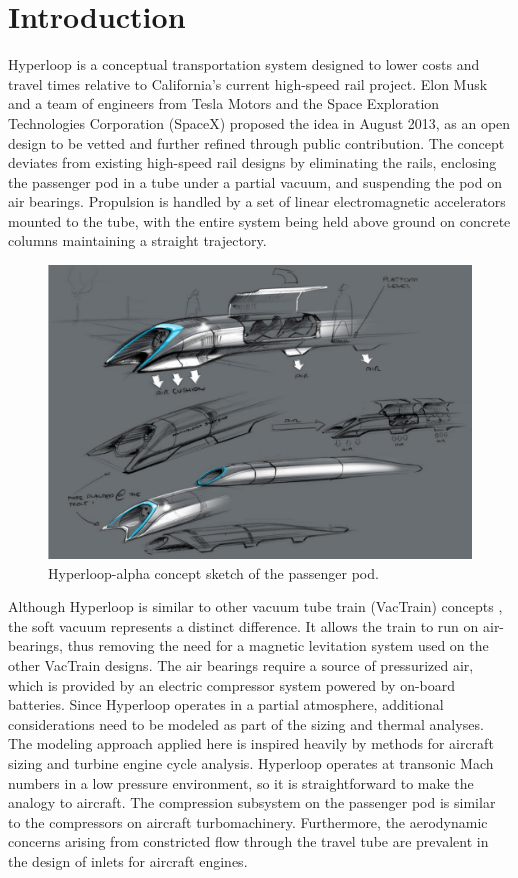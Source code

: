 \documentclass[heading.tex]{subfiles}
\begin{document}
\section{Introduction}

Hyperloop is a conceptual transportation system designed to lower costs and travel times relative to California's current high-speed rail project.
\cite{Musk} Elon Musk and a team of engineers from Tesla Motors and the Space Exploration Technologies Corporation (SpaceX)
proposed the idea in August 2013, as an open design to be vetted and further refined through public contribution.
The concept deviates from existing high-speed rail designs by eliminating the rails, enclosing the passenger pod in a 
tube under a partial vacuum, and suspending the pod on air bearings. Propulsion is handled by a set of linear 
electromagnetic accelerators mounted to the tube, with the entire system being held above ground on concrete 
columns maintaining a straight trajectory.

\begin{figure}[hbtp]
\centering
\includegraphics[width=.75\textwidth]{images/hyperloopAlphaSketch.png}
 \caption[Hyperloop Concept Sketch]{Hyperloop-alpha concept sketch of the passenger pod. \cite{Musk}}
\label{f:hyperloopSketch}
\end{figure}

Although Hyperloop is similar to other vacuum tube train (VacTrain) concepts \cite{ET3}, the soft vacuum represents a distinct difference.
It allows the train to run on air-bearings, thus removing the need for a magnetic levitation system used on the other VacTrain designs.
The air bearings require a source of pressurized air, which is provided by an electric compressor system powered by on-board batteries.
Since Hyperloop operates in a partial atmosphere, additional considerations need to be modeled as part of the sizing and thermal analyses. 
The modeling approach applied here is inspired heavily by methods for aircraft sizing and turbine engine cycle analysis. Hyperloop 
operates at transonic Mach numbers in a low pressure environment, so it is straightforward to make the analogy to aircraft. 
The compression subsystem on the passenger pod is similar to the compressors on aircraft turbomachinery. Furthermore, the aerodynamic concerns  
arising from constricted flow through the travel tube are prevalent in the design of inlets for aircraft engines. 
\end{document}
